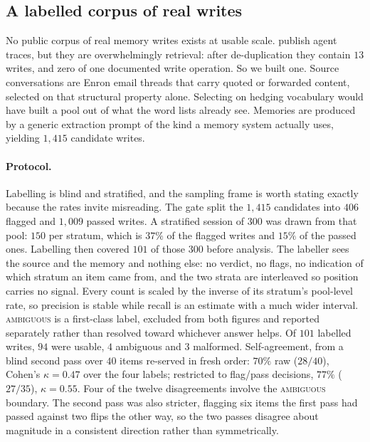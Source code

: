\documentclass[11pt]{article}
\begin{document}
\subsection{A labelled corpus of real writes}
No public corpus of real memory writes exists at usable scale. \citet{packer2023memgpt}
publish agent traces, but they are overwhelmingly retrieval: after de-duplication they
contain $13$ writes, and zero of one documented write operation. So we built one. Source
conversations are Enron email threads \citep{klimt2004enron} that carry quoted or
forwarded content, selected on that structural property alone. Selecting on hedging
vocabulary would have built a pool out of what the word lists already see. Memories are
produced by a generic extraction prompt of the kind a memory system actually uses,
yielding $1{,}415$ candidate writes.

\paragraph{Protocol.} Labelling is blind and stratified, and the sampling frame is worth
stating exactly because the rates invite misreading. The gate split the $1{,}415$
candidates into $406$ flagged and $1{,}009$ passed writes. A stratified session of $300$
was drawn from that pool: $150$ per stratum, which is $37\%$ of the flagged writes and
$15\%$ of the passed ones. Labelling then covered $101$ of those $300$ before analysis.
The labeller sees the source and the memory and nothing else: no verdict, no flags, no
indication of which stratum an item came from, and the two strata are interleaved so
position carries no signal. Every count is scaled by the inverse of its stratum's
pool-level rate, so precision is stable while recall is an estimate with a much wider
interval. \textsc{ambiguous} is a first-class label, excluded from both
figures and reported separately rather than resolved toward whichever answer helps. Of
$101$ labelled writes, $94$ were usable, $4$ ambiguous and $3$ malformed.
Self-agreement, from a blind second pass over $40$ items re-served in fresh order:
$70\%$ raw ($28/40$), Cohen's $\kappa = 0.47$ \citep{cohen1960kappa} over the four
labels; restricted to
flag/pass decisions, $77\%$ ($27/35$), $\kappa = 0.55$. Four of the twelve
disagreements involve the \textsc{ambiguous} boundary. The second pass was also
stricter, flagging six items the first pass had passed against two flips the other
way, so the two passes disagree about magnitude in a consistent direction rather than
symmetrically.
\end{document}
